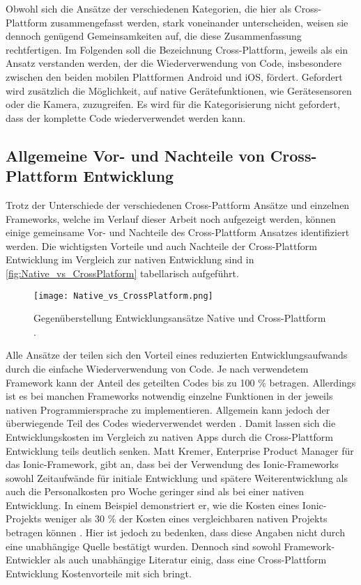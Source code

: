 Obwohl sich die Ansätze der verschiedenen Kategorien, die hier als Cross-Plattform zusammengefasst werden, stark voneinander unterscheiden, weisen sie dennoch genügend Gemeinsamkeiten auf, die diese Zusammenfassung rechtfertigen.
Im Folgenden soll die Bezeichnung Cross-Plattform, jeweils als ein Ansatz verstanden werden, der die Wiederverwendung von Code, insbesondere zwischen den beiden mobilen Plattformen Android und iOS, fördert.
Gefordert wird zusätzlich die Möglichkeit, auf native Gerätefunktionen, wie Gerätesensoren oder die Kamera, zuzugreifen.
Es wird für die Kategorisierung nicht gefordert, dass der komplette Code wiederverwendet werden kann.


\subsection{Allgemeine Vor- und Nachteile von Cross-Plattform Entwicklung}
\label{sec:CrossPlattform_Vorteile}

Trotz der Unterschiede der verschiedenen Cross-Pattform Ansätze und einzelnen Frameworks, welche im Verlauf dieser Arbeit noch aufgezeigt werden, können einige gemeinsame Vor- und Nachteile des Cross-Plattform Ansatzes identifiziert werden.
Die wichtigsten Vorteile und auch Nachteile der Cross-Plattform Entwicklung im Vergleich zur nativen Entwicklung sind in \autoref{fig:Native_vs_CrossPlatform} tabellarisch aufgeführt.
\begin{figure}[H]
    \centering
    \texttt{[image: Native\_vs\_CrossPlatform.png]}
    \caption{Gegenüberstellung Entwicklungsansätze Native und Cross-Plattform \cite{Manchanda_CrossPlatformFrameworks}.}
    \label{fig:Native_vs_CrossPlatform}
\end{figure}

Alle Ansätze der teilen sich den Vorteil eines reduzierten Entwicklungsaufwands durch die einfache Wiederverwendung von Code.
Je nach verwendetem Framework kann der Anteil des geteilten Codes bis zu 100 \% betragen.
Allerdings ist es bei manchen Frameworks notwendig einzelne Funktionen in der jeweils nativen Programmiersprache zu implementieren.
Allgemein kann jedoch der überwiegende Teil des Codes wiederverwendet werden \cite{Nawrocki_Comparison_Hybrid_Native_Frameworks}.
Damit lassen sich die Entwicklungskosten im Vergleich zu nativen Apps durch die Cross-Plattform Entwicklung teils deutlich senken.
Matt Kremer, Enterprise Product Manager für das Ionic-Framework, gibt an, dass bei der Verwendung des Ionic-Frameworks sowohl Zeitaufwände für initiale Entwicklung und spätere Weiterentwicklung als auch die Personalkosten pro Woche geringer sind als bei einer nativen Entwicklung.
In einem Beispiel demonstriert er, wie die Kosten eines Ionic-Projekts weniger als 30 \% der Kosten eines vergleichbaren nativen Projekts betragen können \cite{Kremer_IonicROI}.
Hier ist jedoch zu bedenken, dass diese Angaben nicht durch eine unabhängige Quelle bestätigt wurden.
Dennoch sind sowohl Framework-Entwickler \cite{Xamarin_Einfuehrung, Kremer_IonicROI} als auch unabhängige Literatur \cite{Pinto_Native_to_Cross_Platform, Que_Comparison_Hybrid_Native, Nawrocki_Comparison_Hybrid_Native_Frameworks} einig, dass eine Cross-Plattform Entwicklung Kostenvorteile mit sich bringt.

